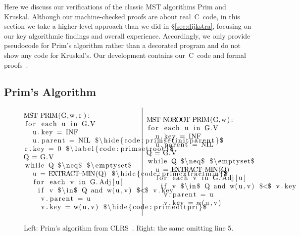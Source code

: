 Here we discuss our verifications of the classic MST algorithms Prim and Kruskal.  Although our machine-checked proofs are about real~C~code, in this section we take a higher-level approach than we did in \S\ref{sec:dijkstra}, focusing on our key algorithmic findings and overall experience.  Accordingly, we only provide pseudocode for Prim's algorithm rather than a decorated program and do not show any code for Kruskal's.  Our development contains our~C~code and formal proofs~\cite{anonrepo}.


\subsection{Prim's Algorithm}
\label{sec:prim}


\begin{figure}[t]
\[
\begin{array}{@{}l@{~~}|@{~~}l@{}}
\begin{minipage}{0.475\textwidth}
\begin{lstlisting}
MST-PRIM(G,w,r):
 for each u in G.V
  u.key = INF
  u.parent = NIL $\hide{code:primsetinitparent}$
 r.key = 0 $\label{code:primsetroot}$
 Q = G.V
 while Q $\neq$ $\emptyset$
  u = EXTRACT-MIN(Q) $\hide{code:primextractmin}$
  for each v in G.Adj[u]
   if v $\in$ Q and w(u,v) $<$ v.key
    v.parent = u
    v.key = w(u,v) $\hide{code:primeditpri}$
\end{lstlisting} \end{minipage} &
\begin{minipage}{0.5\textwidth}
\begin{lstlisting}[numbers=none]
MST-NOROOT-PRIM(G,w):
 for each u in G.V
  u.key = INF
  u.parent = NIL

 Q = G.V
 while Q $\neq$ $\emptyset$
  u = EXTRACT-MIN(Q)
  for each v in G.Adj[u]
   if v $\in$ Q and w(u,v) $<$ v.key
    v.parent = u
    v.key = w(u,v)
\end{lstlisting}
\end{minipage}
\end{array}
\]
\caption{Left: Prim's algorithm from CLRS~\cite{clrs}. Right: the same omitting line 5.}
\label{fig:prims}
\end{figure}

